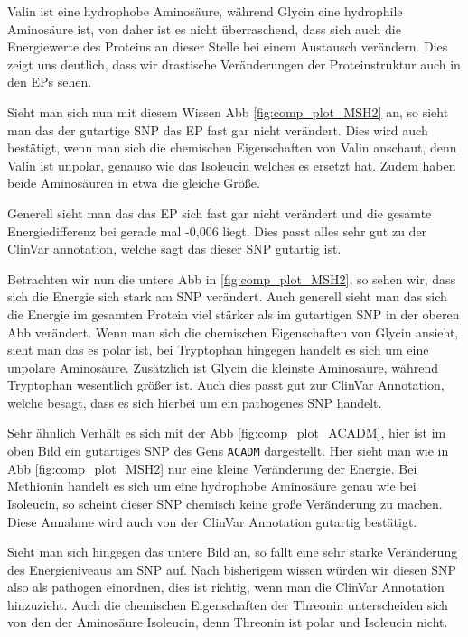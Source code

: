 Valin ist eine hydrophobe Aminosäure, während Glycin eine hydrophile Aminosäure ist, von daher ist es nicht überraschend, dass sich auch die Energiewerte des Proteins an dieser Stelle bei einem Austausch verändern. Dies zeigt uns deutlich, dass wir drastische Veränderungen der Proteinstruktur auch in den \ac{EP}s sehen.

Sieht man sich nun mit diesem Wissen \ac{Abb} \ref{fig:comp_plot_MSH2} an, so sieht man das der gutartige \ac{SNP} das \ac{EP} fast gar nicht verändert. Dies wird auch bestätigt, wenn man sich die chemischen Eigenschaften von Valin anschaut, denn Valin ist unpolar, genauso wie das Isoleucin welches es ersetzt hat. Zudem haben beide Aminosäuren in etwa die gleiche Größe. 

Generell sieht man das das \ac{EP} sich fast gar nicht verändert und die gesamte Energiedifferenz bei gerade mal -0,006 liegt. Dies passt alles sehr gut zu der ClinVar annotation, welche sagt das dieser \ac{SNP} gutartig ist.

Betrachten wir nun die untere \ac{Abb} in \ref{fig:comp_plot_MSH2}, so sehen wir, dass sich die Energie sich stark am \ac{SNP} verändert. Auch generell sieht man das sich die Energie im gesamten Protein viel stärker als im gutartigen \ac{SNP} in der oberen \ac{Abb} verändert. Wenn man sich die chemischen Eigenschaften von Glycin ansieht, sieht man das es polar ist, bei Tryptophan hingegen handelt es sich um eine unpolare Aminosäure. Zusätzlich ist Glycin die kleinste Aminosäure, während Tryptophan wesentlich größer ist. Auch dies passt gut zur ClinVar Annotation, welche besagt, dass es sich hierbei um ein pathogenes \ac{SNP} handelt.

Sehr ähnlich Verhält es sich mit der \ac{Abb} \ref{fig:comp_plot_ACADM}, hier ist im oben Bild ein gutartiges \ac{SNP} des Gens \texttt{ACADM} dargestellt. Hier sieht man wie in \ac{Abb} \ref{fig:comp_plot_MSH2} nur eine kleine Veränderung der Energie. Bei Methionin handelt es sich um eine hydrophobe Aminosäure genau wie bei Isoleucin, so scheint dieser \ac{SNP} chemisch keine große Veränderung zu machen. Diese Annahme wird auch von der ClinVar Annotation gutartig bestätigt. 

Sieht man sich hingegen das untere Bild an, so fällt eine sehr starke Veränderung des Energieniveaus am \ac{SNP} auf. Nach bisherigem wissen würden wir diesen \ac{SNP} also als pathogen einordnen, dies ist richtig, wenn man die ClinVar Annotation hinzuzieht. Auch die chemischen Eigenschaften der Threonin unterscheiden sich von den der Aminosäure Isoleucin, denn Threonin ist polar und Isoleucin nicht. 



